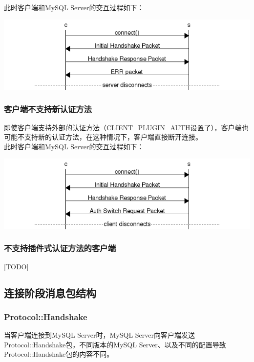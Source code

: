 \documentclass[a4paper, titlepage, 10pt, bookmark]{article}
\begin{document}
此时客户端和MySQL Server的交互过程如下：
\begin{center}
\includegraphics[width=6in]{007.png}
\end{center}

\subsubsection{客户端不支持新认证方法}
即使客户端支持外部的认证方法（CLIENT\_PLUGIN\_AUTH设置了），客户端也可能不支持新的认证方法，在这种情况下，客户端直接断开连接。\\

此时客户端和MySQL Server的交互过程如下：
\begin{center}
\includegraphics[width=6in]{008.png}
\end{center}

\subsubsection{不支持插件式认证方法的客户端}
[TODO]



\subsection{连接阶段消息包结构}
\subsubsection{Protocol::Handshake}
当客户端连接到MySQL Server时，MySQL Server向客户端发送Protocol::Handshake包，不同版本的MySQL Server、以及不同的配置导致Protocol::Handshake包的内容不同。\\
\end{document}
